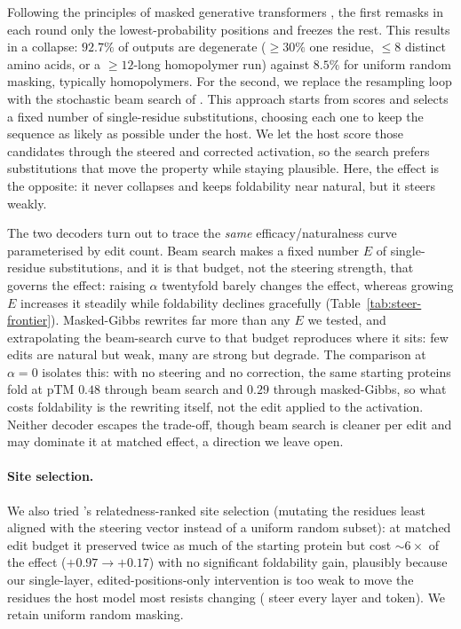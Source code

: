 \documentclass{article}
\begin{document}
Following the principles of masked generative transformers
\cite{chang2022maskgit}, the first remasks in each round only the lowest-probability positions and freezes the rest. This results in a collapse: $92.7\%$ of outputs are degenerate (${\ge}30\%$
one residue, ${\le}8$ distinct amino acids, or a ${\ge}12$-long homopolymer run) against
$8.5\%$ for uniform random masking, typically homopolymers. For the second, we replace the resampling loop with the stochastic beam search of \cite{beamsearch2026plm}. This approach starts from scores and selects a fixed number of
single-residue substitutions, choosing each one to keep the sequence as likely as possible under
the host. We let the host score those candidates through the steered and corrected activation,
so the search prefers substitutions that move the property while staying plausible. Here, the effect is the opposite: it never collapses and keeps
foldability near natural, but it steers weakly.

\newpage
The two decoders turn out to trace the \emph{same} efficacy/naturalness curve parameterised by
edit count. Beam search makes a fixed number $E$ of single-residue substitutions, and it is that
budget, not the steering strength, that governs the effect: raising $\alpha$ twentyfold barely
changes the effect, whereas growing $E$ increases it steadily while foldability declines
gracefully (Table~\ref{tab:steer-frontier}). Masked-Gibbs rewrites far more than any $E$ we
tested, and extrapolating the beam-search curve to that budget reproduces where it sits: few
edits are natural but weak, many are strong but degrade. The
comparison at $\alpha{=}0$ isolates this: with no steering and no correction, the same starting
proteins fold at pTM $0.48$ through beam search and $0.29$ through masked-Gibbs, so what costs
foldability is the rewriting itself, not the edit applied to the activation. Neither decoder
escapes the trade-off, though beam search is cleaner per edit and may dominate it at matched
effect, a direction we leave open.

\iffalse
\paragraph{Site selection.} We also tried \cite{huang2025diffmean}'s relatedness-ranked site
selection (mutating the residues least aligned with the steering vector instead of a uniform
random subset): at matched edit budget it preserved twice as much of the starting protein but
cost ${\sim}6{\times}$ of the effect ($+0.97{\to}+0.17$) with no significant foldability gain,
plausibly because our single-layer, edited-positions-only intervention is too weak to move the
residues the host model most resists changing (\cite{huang2025diffmean} steer every layer and
token). We retain uniform random masking.
\end{document}
